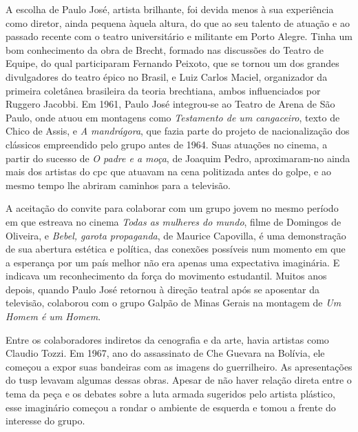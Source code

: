 A escolha de Paulo José, artista brilhante, foi devida menos à sua
experiência como diretor, ainda pequena àquela altura, do que ao seu
talento de atuação e ao passado recente com o teatro universitário e
militante em Porto Alegre. Tinha um bom conhecimento da obra de Brecht,
formado nas discussões do Teatro de Equipe, do qual participaram
Fernando Peixoto, que se tornou um dos grandes divulgadores do teatro
épico no Brasil, e Luiz Carlos Maciel, organizador da primeira coletânea
brasileira da teoria brechtiana, ambos influenciados por Ruggero
Jacobbi. Em 1961, Paulo José integrou-se ao Teatro de Arena de São
Paulo, onde atuou em montagens como {\it Testamento de um cangaceiro},
texto de Chico de Assis, e {\it A mandrágora}, que fazia parte do
projeto de nacionalização dos clássicos empreendido pelo grupo antes de
1964. Suas atuações no cinema, a partir do sucesso de {\it O padre e a
moça}, de Joaquim Pedro, aproximaram-no ainda mais dos artistas do {\sc cpc}
que atuavam na cena politizada antes do golpe, e ao mesmo tempo lhe
abriram caminhos para a televisão.

A aceitação do convite para colaborar com um grupo jovem no mesmo
período em que estreava no cinema {\it Todas as mulheres do mundo},
filme de Domingos de Oliveira, e {\it Bebel, garota propaganda}, de
Maurice Capovilla, é uma demonstração de sua abertura estética e
política, das conexões possíveis num momento em que a esperança por um
país melhor não era apenas uma expectativa imaginária. E indicava um
reconhecimento da força do movimento estudantil. Muitos anos depois,
quando Paulo José retornou à direção teatral após se aposentar da
televisão, colaborou com o grupo Galpão de Minas Gerais na montagem de
{\it Um Homem é um Homem}.


Entre os colaboradores indiretos da cenografia e da arte, havia artistas
como Claudio Tozzi. Em 1967, ano do assassinato de Che Guevara na
Bolívia, ele começou a expor suas bandeiras com as imagens do
guerrilheiro. As apresentações do {\sc tusp} levavam algumas dessas obras.
Apesar de não haver relação direta entre o tema da peça e os debates
sobre a luta armada sugeridos pelo artista plástico, esse imaginário
começou a rondar o ambiente de esquerda e tomou a frente do interesse do
grupo.

